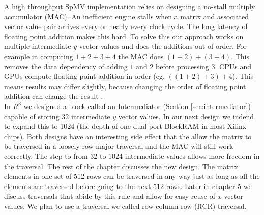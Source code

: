 A high throughput SpMV implementation relies on designing a no-stall multiply accumulator (MAC). An inefficient engine stalls when a matrix and associated vector value pair arrives every or nearly every clock cycle. The long latency of floating point addition makes this hard. To solve this our approach works on multiple intermediate $y$ vector values and does the additions out of order. For example in computing $1+2+3+4$ the MAC does $(1+2)+(3+4)$. This removes the data dependency of adding $1$ and $2$ before processing $3$. CPUs and GPUs compute floating point addition in order (eg. $((1+2)+3)+4$). This means results may differ slightly, because changing the order of floating point addition can change the result \cite{Goldberg:1991:CSK:103162.103163}.\\
\indent In $R^3$ \cite{prelim:townsend0} we designed a block called an Intermediator (Section \ref{sec:intermediator}) capable of storing 32 intermediate $y$ vector values. In our next design we indend to expand this to 1024 (the depth of one dual port BlockRAM in most Xilinx chips). Both designs have an interesting side effect that the allow the matrix to be traversed in a loosely row major traversal and the MAC will still work correctly. The step to from 32 to 1024 intermediate values allows more freedom in the traversal. The rest of the chapter discusses the new design. The matrix elements in one set of 512 rows can be traversed in any way just as long as all the elements are traversed before going to the next 512 rows. Later in chapter 5 we discuss traversals that abide by this rule and allow for easy reuse of $x$ vector values. We plan to use a traversal we called row column row (RCR) traversal.
